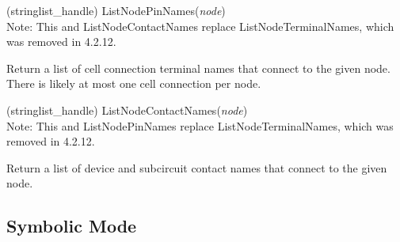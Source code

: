 \begin{description}
\item{(stringlist\_handle) \vt ListNodePinNames({\it node\/})}\\
Note:  This and {\vt ListNodeContactNames} replace {\vt
ListNodeTerminalNames}, which was removed in 4.2.12.

Return a list of cell connection terminal names that connect to the
given node.  There is likely at most one cell connection per node.

\item{(stringlist\_handle) \vt ListNodeContactNames({\it node\/})}\\
Note:  This and {\vt ListNodePinNames} replace {\vt
ListNodeTerminalNames}, which was removed in 4.2.12.

Return a list of device and subcircuit contact names that connect to
the given node.
\end{description}

\subsection{Symbolic Mode}

